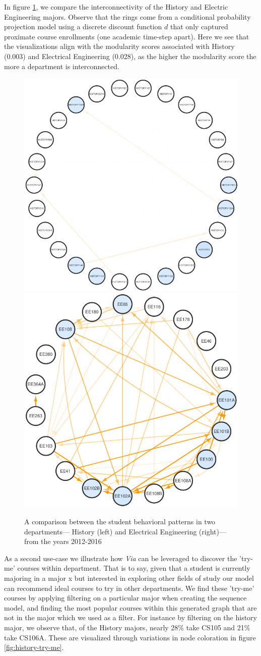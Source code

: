 \documentclass{sigchi}
\begin{document}
In figure \ref{fig:modularity}, we compare the interconnectivity of the History and Electric Engineering majors.  Observe that the rings come from a conditional probability projection model using a discrete discount function $d$ that only captured proximate course enrollments (one academic time-step apart). Here we see that the visualizations align with the modularity scores associated with History (0.003) and Electrical Engineering (0.028), as the higher the modularity score the more a department is interconnected.

\begin{figure}
    \centering
    \includegraphics[width=0.55\columnwidth]{final-modularity-history.pdf}
    \includegraphics[width=0.44\columnwidth]{final-modularity-ee.pdf}
    \caption{A comparison between the student behavioral patterns in two departments--- History (left) and Electrical Engineering (right)--- from the years 2012-2016}
    \label{fig:modularity}
\end{figure}

As a second use-case we illustrate how \textit{Via} can be leveraged to discover the 'try-me' courses within department. That is to say, given that a student is currently majoring in a major x but interested in exploring other fields of study our model can recommend ideal courses to try in other departments. We find these 'try-me' courses by applying filtering on a particular major when creating the sequence model, and finding the most popular courses within this generated graph that are not in the major which we used as a filter. For instance by filtering on the history major, we observe that, of the History majors, nearly 28\% take CS105 and 21\% take CS106A. These are visualized through variations in node coloration in figure \ref{fig:history-try-me}.
\end{document}
